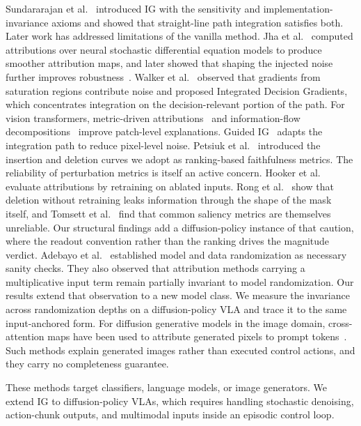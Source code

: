 \documentclass{article}
\begin{document}
Sundararajan et al.~ introduced IG with the sensitivity and implementation-invariance axioms and showed that straight-line path integration satisfies both.
Later work has addressed limitations of the vanilla method.
Jha et al.~ computed attributions over neural stochastic differential equation models to produce smoother attribution maps, and later showed that shaping the injected noise further improves robustness~\cite{jha2022shaping}.
Walker et al.~ observed that gradients from saturation regions contribute noise and proposed Integrated Decision Gradients, which concentrates integration on the decision-relevant portion of the path.
For vision transformers, metric-driven attributions~\cite{walker2025metric} and information-flow decompositions~\cite{walker2025infoflow} improve patch-level explanations. Guided IG~\cite{kapishnikov2021guided} adapts the integration path to reduce pixel-level noise.
Petsiuk et al.~ introduced the insertion and deletion curves we adopt as ranking-based faithfulness metrics.
The reliability of perturbation metrics is itself an active concern.
Hooker et al.~ evaluate attributions by retraining on ablated inputs.
Rong et al.~ show that deletion without retraining leaks information through the shape of the mask itself, and Tomsett et al.~ find that common saliency metrics are themselves unreliable.
Our structural findings add a diffusion-policy instance of that caution, where the readout convention rather than the ranking drives the magnitude verdict.
Adebayo et al.~ established model and data randomization as necessary sanity checks.
They also observed that attribution methods carrying a multiplicative input term remain partially invariant to model randomization.
Our results extend that observation to a new model class.
We measure the invariance across randomization depths on a diffusion-policy VLA and trace it to the same input-anchored form.
For diffusion generative models in the image domain, cross-attention maps have been used to attribute generated pixels to prompt tokens~\cite{tang2023daam}.
Such methods explain generated images rather than executed control actions, and they carry no completeness guarantee.

These methods target classifiers, language models, or image generators.
We extend IG to diffusion-policy VLAs, which requires handling stochastic denoising, action-chunk outputs, and multimodal inputs inside an episodic control loop.
\end{document}
